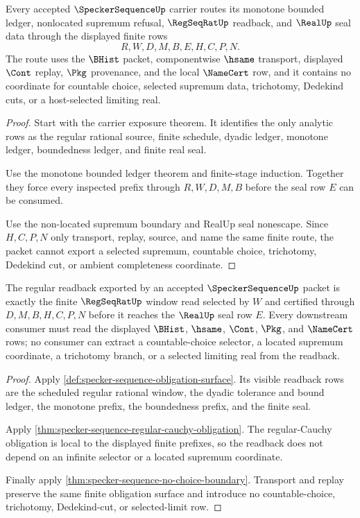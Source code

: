 \begin{theorem}
\label{thm:specker-sequence-obligation-route}
Every accepted $\SpeckerSequenceUp$ carrier routes its monotone bounded ledger, nonlocated supremum refusal, $\RegSeqRatUp$ readback, and $\RealUp$ seal data through the displayed finite rows
$$
R,W,D,M,B,E,H,C,P,N.
$$
The route uses the $\BHist$ packet, componentwise $\hsame$ transport, displayed $\Cont$ replay, $\Pkg$ provenance, and the local $\NameCert$ row, and it contains no coordinate for countable choice, selected supremum data, trichotomy, Dedekind cuts, or a host-selected limiting real.
\end{theorem}
\begin{proof}
Start with the carrier exposure theorem. It identifies the only analytic rows as the regular rational source, finite schedule, dyadic ledger, monotone ledger, boundedness ledger, and finite real seal.

Use the monotone bounded ledger theorem and finite-stage induction. Together they force every inspected prefix through $R,W,D,M,B$ before the seal row $E$ can be consumed.

Use the non-located supremum boundary and RealUp seal nonescape. Since $H,C,P,N$ only transport, replay, source, and name the same finite route, the packet cannot export a selected supremum, countable choice, trichotomy, Dedekind cut, or ambient completeness coordinate.
\end{proof}

\begin{theorem}
\label{thm:specker-sequence-regular-readback-scope}
The regular readback exported by an accepted $\SpeckerSequenceUp$ packet is exactly the finite $\RegSeqRatUp$ window read selected by $W$ and certified through $D,M,B,H,C,P,N$ before it reaches the $\RealUp$ seal row $E$. Every downstream consumer must read the displayed $\BHist$, $\hsame$, $\Cont$, $\Pkg$, and $\NameCert$ rows; no consumer can extract a countable-choice selector, a located supremum coordinate, a trichotomy branch, or a selected limiting real from the readback.
\end{theorem}
\begin{proof}
Apply \autoref{def:specker-sequence-obligation-surface}. Its visible readback rows are the scheduled regular rational window, the dyadic tolerance and bound ledger, the monotone prefix, the boundedness prefix, and the finite seal.

Apply \autoref{thm:specker-sequence-regular-cauchy-obligation}. The regular-Cauchy obligation is local to the displayed finite prefixes, so the readback does not depend on an infinite selector or a located supremum coordinate.

Finally apply \autoref{thm:specker-sequence-no-choice-boundary}. Transport and replay preserve the same finite obligation surface and introduce no countable-choice, trichotomy, Dedekind-cut, or selected-limit row.
\end{proof}

